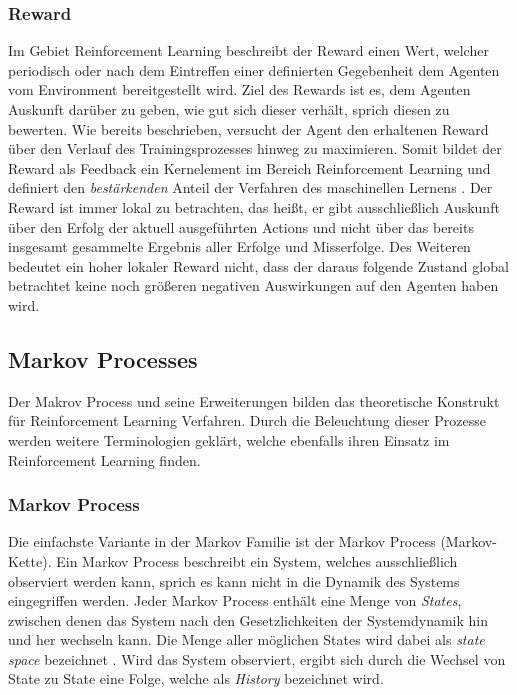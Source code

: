 \documentclass[11pt]{scrartcl}
\begin{document}
\subsubsection{Reward}
Im Gebiet Reinforcement Learning beschreibt der Reward einen Wert, welcher periodisch oder nach
dem Eintreffen einer definierten Gegebenheit dem Agenten vom Environment bereitgestellt wird.
Ziel des Rewards ist es, dem Agenten Auskunft darüber zu geben, wie gut sich dieser verhält, sprich
diesen zu bewerten. Wie bereits beschrieben, versucht der Agent den erhaltenen Reward über den
Verlauf des Trainingsprozesses hinweg zu maximieren. Somit bildet der Reward als Feedback ein
Kernelement im Bereich Reinforcement Learning und definiert den \textit{bestärkenden} Anteil der 
Verfahren des maschinellen Lernens \cite[~S.6 f.]{L2018}. Der Reward ist immer lokal zu betrachten,
das heißt, er gibt ausschließlich Auskunft über den Erfolg der aktuell ausgeführten Actions und
nicht über das bereits insgesamt gesammelte Ergebnis aller Erfolge und Misserfolge. Des Weiteren
bedeutet ein hoher lokaler Reward nicht, dass der daraus folgende Zustand global betrachtet keine
noch größeren negativen Auswirkungen auf den Agenten haben wird.


\subsection{Markov Processes}
Der Makrov Process und seine Erweiterungen bilden das theoretische Konstrukt für Reinforcement Learning
Verfahren. Durch die Beleuchtung dieser Prozesse werden weitere Terminologien geklärt, welche ebenfalls
ihren Einsatz im Reinforcement Learning finden.


\subsubsection{Markov Process}
Die einfachste Variante in der Markov Familie ist der Markov Process (Markov-Kette). Ein Markov Process
beschreibt ein System, welches ausschließlich observiert werden kann, sprich es kann nicht in die Dynamik
des Systems eingegriffen werden. Jeder Markov Process enthält eine Menge von \textit{States}, zwischen
denen das System nach den Gesetzlichkeiten der Systemdynamik hin und her wechseln kann. Die Menge aller
möglichen States wird dabei als \textit{state space} bezeichnet \cite[~S.12]{L2018}. Wird das System
observiert, ergibt sich durch die Wechsel von State zu State eine Folge, welche als \textit{History}
bezeichnet wird. 
\end{document}
